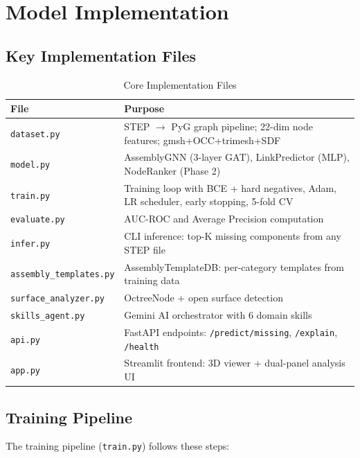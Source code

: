 \documentclass[12pt]{report}
\begin{document}
\section{Model Implementation}

\subsection{Key Implementation Files}

\begin{table}[H]
\centering
\caption{Core Implementation Files}
\begin{tabular}{l p{8cm}}
\toprule
\textbf{File} & \textbf{Purpose} \\
\midrule
\texttt{dataset.py} & STEP $\rightarrow$ PyG graph pipeline; 22-dim node features; gmsh+OCC+trimesh+SDF \\
\texttt{model.py} & AssemblyGNN (3-layer GAT), LinkPredictor (MLP), NodeRanker (Phase 2) \\
\texttt{train.py} & Training loop with BCE + hard negatives, Adam, LR scheduler, early stopping, 5-fold CV \\
\texttt{evaluate.py} & AUC-ROC and Average Precision computation \\
\texttt{infer.py} & CLI inference: top-K missing components from any STEP file \\
\texttt{assembly\_templates.py} & AssemblyTemplateDB: per-category templates from training data \\
\texttt{surface\_analyzer.py} & OctreeNode + open surface detection \\
\texttt{skills\_agent.py} & Gemini AI orchestrator with 6 domain skills \\
\texttt{api.py} & FastAPI endpoints: \texttt{/predict/missing}, \texttt{/explain}, \texttt{/health} \\
\texttt{app.py} & Streamlit frontend: 3D viewer + dual-panel analysis UI \\
\bottomrule
\end{tabular}
\end{table}

\subsection{Training Pipeline}

The training pipeline (\texttt{train.py}) follows these steps:
\end{document}
